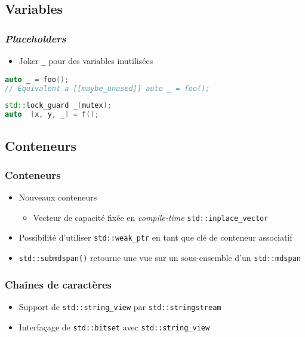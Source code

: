 \documentclass[C++.tex]{subfiles}
\begin{document}
\subsection*{Variables}
\begin{frame}[fragile]
	\frametitle{\textit{Placeholders}}
	\begin{itemize}
		\item Joker \lstinline|_| pour des variables inutilisées
	\end{itemize}
	
	\begin{lstlisting}[language=C++]
auto _ = foo();
// Equivalent a [[maybe_unused]] auto _ = foo();\end{lstlisting}

	\begin{lstlisting}[language=C++]
std::lock_guard _(mutex);
auto  [x, y, _] = f();\end{lstlisting}
\end{frame}

\subsection*{Conteneurs}
\begin{frame}[fragile]
	\frametitle{Conteneurs}
	\begin{itemize}
		\item Nouveaux conteneurs
		\begin{itemize}
			\item Vecteur de capacité fixée en \textit{compile-time} \lstinline|std::inplace_vector|

		\end{itemize}
		\item Possibilité d'utiliser \lstinline|std::weak_ptr| en tant que clé de conteneur associatif
		\item \lstinline|std::submdspan()| retourne une vue sur un sous-ensemble d'un \lstinline|std::mdspan|
	\end{itemize}
\end{frame}

\begin{frame}[fragile]
	\frametitle{Chaînes de caractères}
	\begin{itemize}
		\item Support de \lstinline|std::string_view| par \lstinline|std::stringstream|
		\item Interfaçage de \lstinline|std::bitset| avec \lstinline|std::string_view|
	\end{itemize}
\end{frame}
\end{document}
